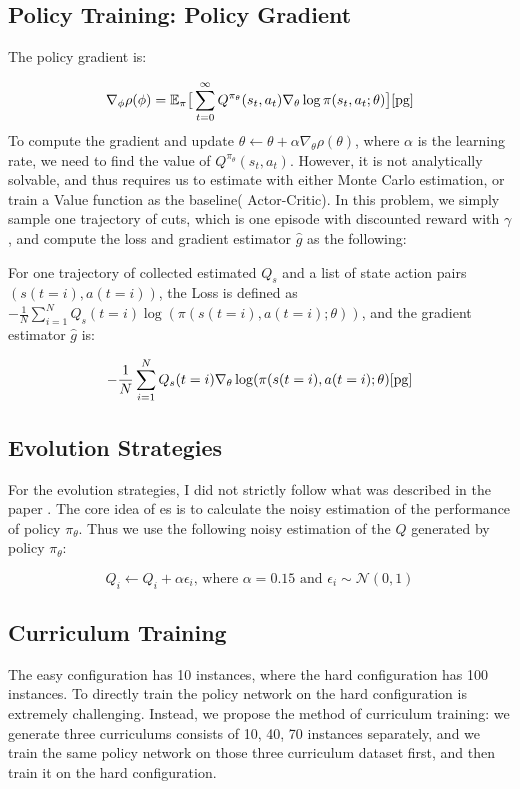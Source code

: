 \documentclass{article}
\begin{document}
\subsection{Policy Training: Policy Gradient}

The policy gradient is: 

$$\nabla_\phi \rho(\phi) = \mathbb{E}_{\pi} \big[\sum_{t=0}^\infty Q^{\pi_\theta}(s_t,a_t) \nabla_\theta \log \pi(s_t, a_t ; \theta) \big]\cite{pg}$$
To compute the gradient and update $\theta \leftarrow \theta + \alpha \nabla_\theta \rho(\theta)$, where $\alpha$ is the learning rate, we need to find the value of
 $Q^{\pi_\theta}(s_t,a_t)$. However, it is not analytically solvable, and thus requires us to estimate with either Monte Carlo estimation, or train a Value function as the baseline( Actor-Critic). In this problem, we simply sample one trajectory of cuts, which is one episode with discounted reward with $\gamma$, and compute the loss and gradient estimator $\hat g$ as the following: 

For one trajectory of collected estimated $Q_s$ and a list of state action pairs $(s(t = i), a(t = i))$, the Loss is defined as $-\frac{1}{N} \sum_{i=1}^N Q_s(t = i) \log(\pi(s(t = i), a(t = i) ; \theta)) $, and the gradient estimator $\hat g$ is:

$$- \frac{1}{N} \sum_{i=1}^N Q_s(t = i)  \nabla_\theta \log(\pi(s(t = i), a(t = i) ; \theta)\cite{pg} $$

\subsection{Evolution Strategies}
For the evolution strategies, I did not strictly follow what was described in the paper \cite{rlcut}. The core idea of es is to calculate the noisy estimation of the performance of policy $\pi_\theta$. Thus we use the following noisy estimation of the $Q$ generated by policy $\pi_\theta$:

$$Q_i \leftarrow Q_i + \alpha \epsilon_i \text{, where } \alpha = 0.15 \text{ and } \epsilon_i \sim \mathcal{N}(0,1)$$

\subsection{Curriculum Training}

The easy configuration has 10 instances, where the hard configuration has 100 instances. To directly train the policy network on the hard configuration is extremely challenging. Instead, we propose the method of curriculum training: we generate three curriculums consists of 10, 40, 70 instances separately, and we train the same policy network on those three curriculum dataset first, and then train it on the hard configuration.
\end{document}
